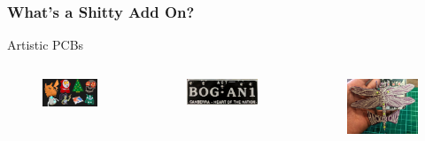 \documentclass[t]{beamer}
\begin{document}
\begin{frame}
\frametitle{What's a Shitty Add On?}
Artistic PCBs 
\begin{columns}[c]
	\begin{figure}
		\includegraphics[width=1\linewidth]{shittyadd-ons.png}
	\end{figure}

	\begin{figure}
		\includegraphics[width=1\linewidth]{bogan.jpg}
	\end{figure}
	
	\begin{figure}
		\includegraphics[width=1\linewidth]{hackerchix.jpg}
	\end{figure}
	

\end{columns}
\end{frame}
\end{document}
